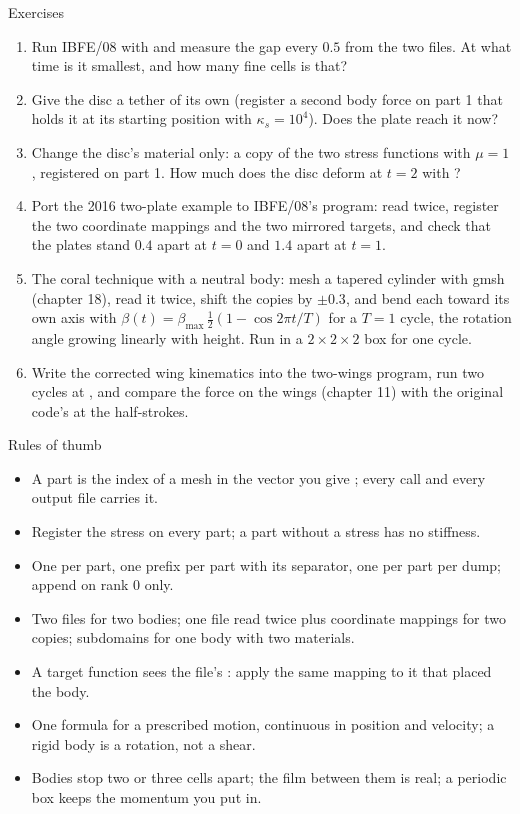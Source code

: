 \documentclass[aspectratio=169,11pt]{beamer}
\begin{document}
\begin{frame}{Exercises}
\label{fr:exercises}
\footnotesize
\begin{enumerate}
  \item Run IBFE/08 with  and measure the gap every $0.5$ from the two files. At what time is it smallest, and how many fine cells is that?
  \item Give the disc a tether of its own (register a second body force on part 1 that holds it at its starting position with $\kappa_s = 10^4$). Does the plate reach it now?
  \item Change the disc's material only: a copy of the two stress functions with $\mu = 1$, registered on part 1. How much does the disc deform at $t = 2$ with ?
  \item Port the 2016 two-plate example to IBFE/08's program: read  twice, register the two coordinate mappings and the two mirrored targets, and check that the plates stand $0.4$ apart at $t = 0$ and $1.4$ apart at $t = 1$.
  \item The coral technique with a neutral body: mesh a tapered cylinder with gmsh (chapter 18), read it twice, shift the copies by $\pm0.3$, and bend each toward its own axis with $\beta(t) = \beta_{\max}\,\tfrac12(1 - \cos 2\pi t/T)$ for a $T = 1$ cycle, the rotation angle growing linearly with height. Run in a $2\times2\times2$ box for one cycle.
  \item Write the corrected wing kinematics into the two-wings program, run two cycles at , and compare the force on the wings (chapter 11) with the original code's at the half-strokes.
\end{enumerate}
\end{frame}

\begin{frame}{Rules of thumb}
\label{fr:thumb}
\small
\begin{itemize}
  \item A part is the index of a mesh in the vector you give ; every  call and every output file carries it.
  \item Register the stress on every part; a part without a stress has no stiffness.
  \item One  per part, one prefix per part with its separator, one  per part per dump; append on rank $0$ only.
  \item Two files for two bodies; one file read twice plus coordinate mappings for two copies; subdomains for one body with two materials.
  \item A target function sees the file's : apply the same mapping to it that placed the body.
  \item One formula for a prescribed motion, continuous in position and velocity; a rigid body is a rotation, not a shear.
  \item Bodies stop two or three cells apart; the film between them is real; a periodic box keeps the momentum you put in.
\end{itemize}
\end{frame}
\end{document}
